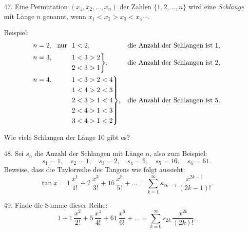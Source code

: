 \begin{problem}{47.}
	Eine Permutation $(x_1,x_2, \dotsc,x_n)$ der Zahlen $\{1, 2, \dotsc, n\}$ wird eine
	\emph{Schlange} mit Länge $n$ genannt, wenn $x_1<x_2>x_3<x_4 \dotsb$.

	\begin{note}{Beispiel:}
		\begin{equation*}
			\begin{aligned}[t]
				&\begin{aligned}[t] n=2, \text{\ \ nur\ \ } 1<2, \end{aligned} &&\text{die Anzahl der Schlangen ist }1, \\
				&\hskip-\nulldelimiterspace\mathord{\left.\begin{aligned} n=3, \hphantom{\text{\ \ nur\ \ }} 1&<3>2 \\
				2&<3>1\end{aligned} \right\}}, && \text{die Anzahl der Schlangen ist }2, \\
				&\hskip-\nulldelimiterspace\mathord{\left.\begin{aligned} n=4, \hphantom{\text{\ \ nur\ \ }} 1&<3>2<4 \\
				1&<4>2<3 \\
				2&<3>1<4 \\
				2&<4>1<3 \\
				3&<4>1<2\end{aligned} \right\}},
				&&\text{die Anzahl der Schlangen ist }5. \\
			\end{aligned}
		\end{equation*}
	\end{note}
	Wie viele Schlangen der Länge 10 gibt es?
\end{problem}

\begin{problem}{48.}
	Sei $s_n$ die Anzahl der Schlangen mit Länge $n$, also zum Beispiel:
	\begin{equation*}
		s_1=1, \quad s_2=1, \quad s_3=2, \quad s_4=5, \quad s_5=16, \quad s_6=61.
	\end{equation*}
	Beweise, dass die Taylorreihe des Tangens wie folgt aussieht:
	\begin{equation*}
		\tan x=1\, \frac{x^1}{1!}+2\, \frac{x^3}{3!}+16\, \frac{x^5}{5!}+\dots=
		\textstyle\sum\limits_{k=1}^{\infty} s_{2k-1}\, \frac{x^{2k-1}}{(2k-1)!}.
	\end{equation*}
\end{problem}

\begin{problem}{49.}
	Finde die Summe dieser Reihe:
	\begin{equation*}
		1+1\, \frac{x^2}{2!}+5\, \frac{x^4}{4!}+61\, \frac{x^6}{6!}+\dots=
		\textstyle\sum\limits_{k=0}^{\infty} s_{2k}\,\frac{x^{2k}}{(2k)!}.
	\end{equation*}
\end{problem}

